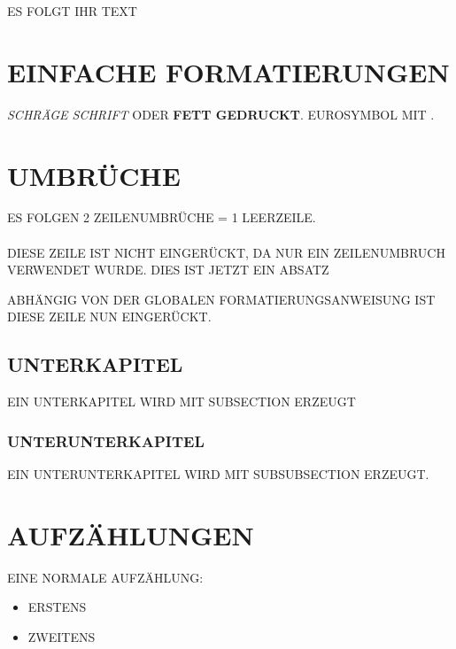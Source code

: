 \documentclass[a4paper,12pt]{report}
\begin{document}
ES FOLGT IHR TEXT

\section{EINFACHE FORMATIERUNGEN}
\thispagestyle{fancy} %
\textit{SCHRÄGE SCHRIFT} ODER \textbf{FETT GEDRUCKT}. EUROSYMBOL MIT \EUR.

\section{UMBRÜCHE}
\thispagestyle{fancy} %
ES FOLGEN 2 ZEILENUMBRÜCHE = 1 LEERZEILE.\\
\\
DIESE ZEILE IST NICHT EINGERÜCKT, DA NUR EIN ZEILENUMBRUCH VERWENDET
WURDE. DIES IST JETZT EIN ABSATZ\par
ABHÄNGIG VON DER GLOBALEN FORMATIERUNGSANWEISUNG IST DIESE ZEILE NUN
EINGERÜCKT.



\subsection{UNTERKAPITEL}
\thispagestyle{fancy} %
EIN UNTERKAPITEL WIRD MIT SUBSECTION ERZEUGT

\subsubsection{UNTERUNTERKAPITEL}
\thispagestyle{fancy} %
\label{sec:unterunterkapitel} %
EIN UNTERUNTERKAPITEL WIRD MIT SUBSUBSECTION ERZEUGT.

\section{AUFZÄHLUNGEN}
\thispagestyle{fancy} %
\label{sec:aufzaehlungen} %

EINE NORMALE AUFZÄHLUNG:
\begin{itemize}
\item ERSTENS
\item ZWEITENS
\end{itemize}
\end{document}
